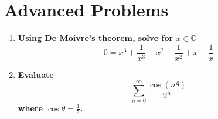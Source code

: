\documentclass[12pt]{article}
\begin{document}
\section*{Advanced Problems}
\begin{enumerate}
    \item \textbf{Using De Moivre's theorem, solve for $x \in \mathbb{C}$
    \begin{equation*}
        0 = x^3 + \frac{1}{x^3} + x^2 + \frac{1}{x^2} + x + \frac{1}{x}
    \end{equation*}}
    
    \item \textbf{Evaluate $$\sum_{n = 0}^{\infty} \frac{\cos{(n\theta)}}{2^n}$$ where $\cos{\theta} = \frac{1}{5}$.}
\end{enumerate}
\end{document}
